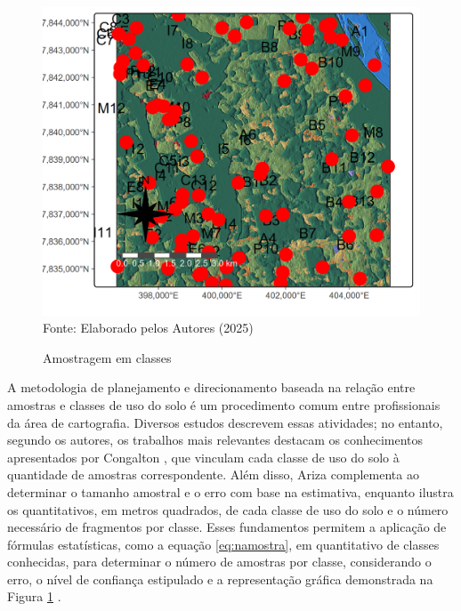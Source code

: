                 \begin{figure}
  	\begin{center}
  		\centering  \small \caption{Amostragem em classes}
  		\includegraphics[width=0.97\linewidth]{FIGURAS/usoSOLOamostras}
  		\label{fig:usoSOLOamostras}\\{ Fonte:   Elaborado pelos Autores (2025)}
  	\end{center}
  \end{figure} 
 \hspace*{1.25 cm} A metodologia de planejamento e direcionamento baseada na relação entre amostras e classes de uso do solo é um procedimento comum entre profissionais da área de cartografia. Diversos estudos descrevem essas atividades; no entanto, segundo os autores, os trabalhos mais relevantes destacam os conhecimentos apresentados por Congalton \cite[p.79]{Congalton}, que vinculam cada classe de uso do solo à quantidade de amostras correspondente. Além disso, Ariza \cite[p.135]{Ariza} complementa ao determinar o tamanho amostral e o erro com base na estimativa, enquanto \cite[p.192-196]{Ariza} ilustra os quantitativos, em metros quadrados, de cada classe de uso do solo e o número necessário de fragmentos por classe. Esses fundamentos permitem a aplicação de fórmulas estatísticas, como a equação \eqref{eq:namostra}, em quantitativo de classes conhecidas,  para determinar o número de amostras por classe, considerando o erro, o nível de confiança estipulado e a representação gráfica demonstrada na Figura \ref{fig:usoSOLOamostras}  .\\
